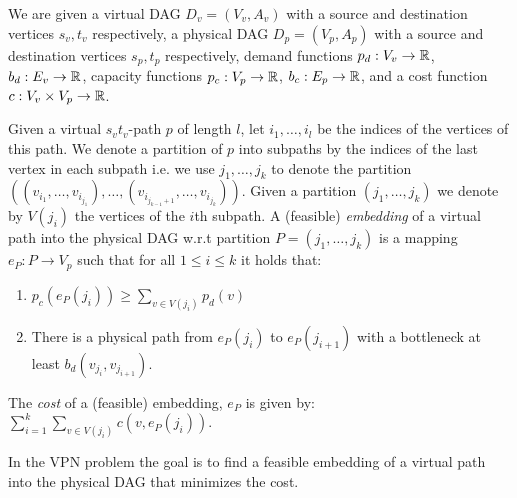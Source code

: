 We are given a virtual DAG $D_v = (V_v, A_v)$ 
with a source and destination vertices $s_v, t_v$ respectively, 
a physical DAG $D_p = (V_p, A_p)$
with a source and destination vertices $s_p, t_p$ respectively,
demand functions $p_d : V_v \to \mathbb{R}$, $b_d : E_v \to \mathbb{R}$,
capacity functions $p_c : V_p \to \mathbb{R}$, $b_c : E_p \to \mathbb{R}$,
and a cost function $c: V_v \times V_p \to \mathbb{R}$. 

Given a virtual $s_vt_v$-path $p$ of length $l$,
let $i_1, \ldots, i_l$ be the indices of the vertices of this path.
We denote a partition of $p$ into subpaths by the indices of the last vertex in
each subpath i.e. we use $j_1, \ldots, j_k$ to denote the partition 
$((v_{i_1}, \ldots, v_{i_{j_1}}), \ldots, (v_{i_{j_{k-1} + 1}}, \ldots,
v_{i_{j_k}}))$.
Given a partition $(j_1, \ldots, j_k)$ we denote by $V(j_i)$ the vertices of the
$i$th subpath.
A (feasible) \emph{embedding} of a virtual path into the physical DAG 
w.r.t partition $P = (j_1, \ldots,j_k)$ is a mapping $e_P : P \to V_p$ such that
for all $1 \leq i \leq k$ it holds that:
\begin{enumerate}
  \item $p_c(e_P(j_i)) \geq \sum_{v \in V(j_i)} p_d(v)$
  \item There is a physical path from $e_P(j_i)$ to $e_P(j_{i+1})$ with a
  bottleneck at least $b_d(v_{j_i}, v_{j_{i+1}})$.
\end{enumerate}
The \emph{cost} of a (feasible) embedding, $e_P$ is given by:
$\sum_{i = 1}^k \sum_{v \in V(j_i)} c(v, e_P(j_i))$.   

In the  VPN problem the goal is to find a
feasible embedding of a virtual path into the physical DAG that minimizes the
cost.

\begin{figure}[ht]
\centering
\scalebox{.87}{

}

\end{figure}
